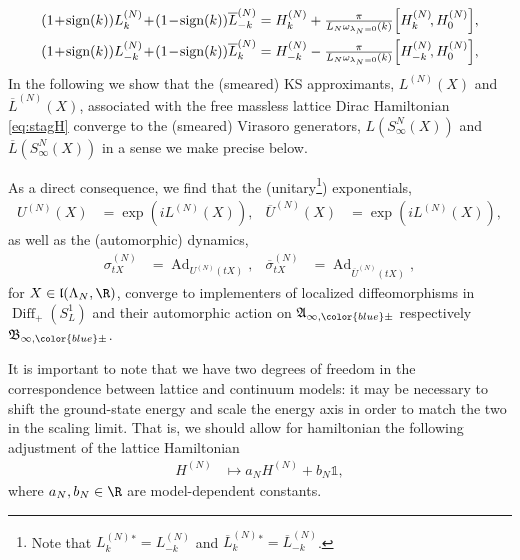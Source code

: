 \documentclass[a4paper, 11pt]{article}
\newcommand{\fA}{\mathfrak{A}}\newcommand{\cA}{\mathcal{A}}\newcommand{\dA}{\mathds{A}}\newcommand{\sA}{\mathscr{A}}
\newcommand{\fB}{\mathfrak{B}}\newcommand{\cB}{\mathcal{B}}\newcommand{\dB}{\mathds{B}}\newcommand{\sB}{\mathscr{B}}
\newcommand{\fl}{\mathfrak{l}}\newcommand{\cl}{\mathcal{l}}
\DeclareMathOperator{\Ad}{Ad}
\DeclareMathOperator{\1}{\mathds{1}}
\DeclareMathOperator{\Diff}{Diff}
\DeclareMathOperator{\sign}{\textup{sign}}
\begin{document}
\begin{align}
\label{eq:latvira}
(1\!+\!\sign(k))L_{k}^{(N)}\!+\!(1\!-\!\sign(k))\overline{L}_{-k}^{(N)} & = H_{k}^{(N)} + \tfrac{\pi}{L_{N} \omega_{\lambda_{N}=0}(k)}\Big[H_{k}^{(N)}\!,H_0^{(N)}\Big], \\ \nonumber
(1\!+\!\sign(k))L_{-k}^{(N)}\!+\!(1\!-\!\sign(k))\overline{L}_{k}^{(N)} & = H_{-k}^{(N)} - \tfrac{\pi}{L_{N} \omega_{\lambda_{N}=0}(k)}\Big[H_{-k}^{(N)}\!,H_0^{(N)}\Big],
\end{align}
In the following we show that the (smeared) KS approximants, $L^{(N)}(X)$ and $\overline{L}^{(N)}(X)$, associated with the free massless lattice Dirac Hamiltonian \eqref{eq:stagH} converge to the (smeared) Virasoro generators, $L(S^{N}_{\infty}(X))$ and $\overline{L}(S^{N}_{\infty}(X))$ in a sense we make precise below.

As a direct consequence, we find that the (unitary\footnote{Note that $L^{(N)}_{k}{}^{*} = L^{(N)}_{-k}$ and $\overline{L}^{(N)}_{k}{}^{*} = \overline{L}^{(N)}_{-k}$.}) exponentials,
\begin{align}
\label{eq:latviraexp}
U^{(N)}(X) & = \exp(iL^{(N)}(X)), & \overline{U}^{(N)}(X) & = \exp(iL^{(N)}(X)),
\end{align}
as well as the (automorphic) dynamics,
\begin{align}
\label{eq:latviradyn}
\sigma^{(N)}_{tX} & =  \Ad_{U^{(N)}(tX)}, & \overline{\sigma}^{(N)}_{tX} & =  \Ad_{\overline{U}^{(N)}(tX)},
\end{align}
for $X\in\fl(\Lambda_{N},\R)$, converge to implementers of localized diffeomorphisms in $\Diff_{+}(S^{1}_{L})$ and their automorphic action on $\fA_{\infty,{\color{blue}\pm}}$ respectively $\fB_{\infty,{\color{blue}\pm}}$.

It is important to note that we have two degrees of freedom in the correspondence between lattice and continuum models: it may be necessary to shift the ground-state energy and scale the energy axis in order to match the two in the scaling limit. That is, we should allow for hamiltonian the following adjustment of the lattice Hamiltonian
\begin{align}
\label{eq:scaleshift}
H^{(N)} & \mapsto a_{N} H^{(N)} + b_{N} \mathds{1},
\end{align}  
where $a_{N}, b_{N}\in\R$ are model-dependent constants.
\end{document}
